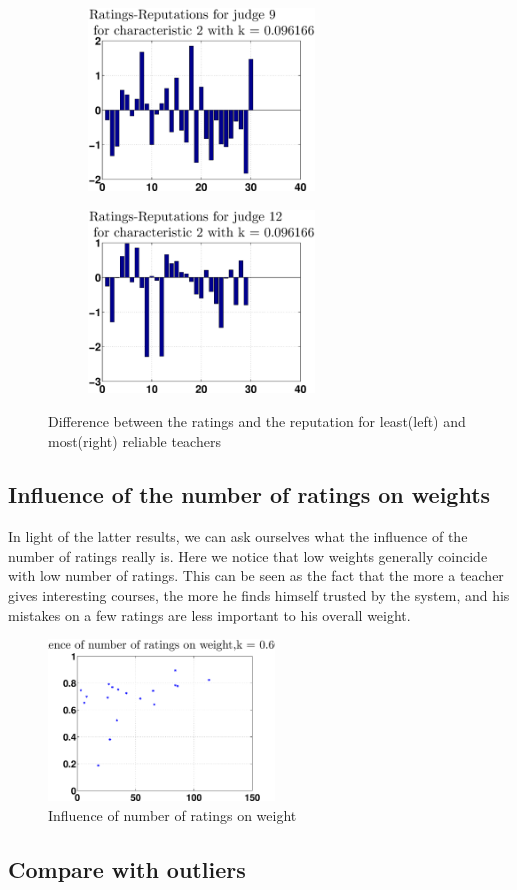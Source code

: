 \documentclass[12pt,a4paper]{article}
\begin{document}
\begin{figure}[!h]
\centering
\begin{subfigure}[b]{0.48\textwidth}
\includegraphics[width = 6cm]{preprocessSelect/ppsdiffRaReLeastK3fb89e54e9211a25c2.eps}
\end{subfigure}
\begin{subfigure}[b]{0.48\textwidth}
\includegraphics[width = 6cm]{preprocessSelect/ppsdiffRaReMostK3fb89e54e9211a25c2.eps}
\end{subfigure}
\caption{\label{diffLM}Difference between the ratings and the reputation for least(left) and most(right) reliable teachers}
\end{figure}

\subsection*{Influence of the number of ratings on weights}
In light of the latter results, we can ask ourselves what the influence of the number of ratings really is. Here we notice that low weights generally coincide with low number of ratings. This can be seen as the fact that the more a teacher gives interesting courses, the more he finds himself trusted by the system, and his mistakes on a few ratings are less important to his overall weight.
\begin{figure}
\centering
\includegraphics[width = 6cm]{preprocessSelect/ppsnumRatvsWK6000.eps}
\caption{Influence of number of ratings on weight}
\end{figure}

\FloatBarrier

\subsection{Compare with outliers}



\nocite{*}
\end{document}
